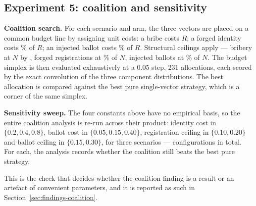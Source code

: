 \subsection{Experiment 5: coalition and sensitivity}
\label{sec:exp-sensitivity}

\textbf{Coalition search.} For each scenario and arm, the three vectors
are placed on a common budget line by assigning unit costs: a bribe
costs $R$; a forged identity costs \IdentityCostRatio\% of $R$; an
injected ballot costs \BallotCostRatio\% of $R$. Structural ceilings
apply --- bribery at $N$ by , forged registrations at
\SybilCeilingPct\% of $N$, injected ballots at \BallotCeilingPct\% of
$N$. The budget simplex is then evaluated exhaustively at a 0.05 step,
231 allocations, each scored by the exact convolution of the three
component distributions. The best allocation is compared against the
best pure single-vector strategy, which is a corner of the same
simplex.

\textbf{Sensitivity sweep.} The four constants above have no empirical
basis, so the entire coalition analysis is re-run across their product:
identity cost in $\{0.2, 0.4, 0.8\}$, ballot cost in $\{0.05, 0.15,
0.40\}$, registration ceiling in $\{0.10, 0.20\}$ and ballot ceiling in
$\{0.15, 0.30\}$, for three scenarios --- \SensitivityConfigs{}
configurations in total. For each, the analysis records whether the
coalition still beats the best pure strategy.

This is the check that decides whether the coalition finding is a
result or an artefact of convenient parameters, and it is reported as
such in Section~\ref{sec:findings-coalition}.
